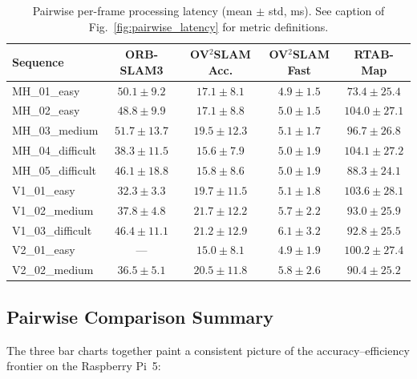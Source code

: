 \documentclass[11pt]{article}
\begin{document}
\begin{table}[htbp]
  \centering
  \caption{Pairwise per-frame processing latency (mean $\pm$ std, ms). See caption of Fig.~\ref{fig:pairwise_latency} for metric definitions.}
  \label{tab:pairwise_latency}
  \small
  \begin{tabular}{lcccc}
    \hline
    Sequence & ORB-SLAM3 & OV$^2$SLAM Acc. & OV$^2$SLAM Fast & RTAB-Map \\
    \hline
    MH\_01\_easy      & $50.1 \pm 9.2$   & $17.1 \pm 8.1$  & $4.9 \pm 1.5$  & $73.4 \pm 25.4$ \\
    MH\_02\_easy      & $48.8 \pm 9.9$   & $17.1 \pm 8.8$  & $5.0 \pm 1.5$  & $104.0 \pm 27.1$ \\
    MH\_03\_medium    & $51.7 \pm 13.7$  & $19.5 \pm 12.3$ & $5.1 \pm 1.7$  & $96.7 \pm 26.8$ \\
    MH\_04\_difficult & $38.3 \pm 11.5$  & $15.6 \pm 7.9$  & $5.0 \pm 1.9$  & $104.1 \pm 27.2$ \\
    MH\_05\_difficult & $46.1 \pm 18.8$  & $15.8 \pm 8.6$  & $5.0 \pm 1.9$  & $88.3 \pm 24.1$ \\
    V1\_01\_easy      & $32.3 \pm 3.3$   & $19.7 \pm 11.5$ & $5.1 \pm 1.8$  & $103.6 \pm 28.1$ \\
    V1\_02\_medium    & $37.8 \pm 4.8$   & $21.7 \pm 12.2$ & $5.7 \pm 2.2$  & $93.0 \pm 25.9$ \\
    V1\_03\_difficult & $46.4 \pm 11.1$  & $21.2 \pm 12.9$ & $6.1 \pm 3.2$  & $92.8 \pm 25.5$ \\
    V2\_01\_easy      & ---              & $15.0 \pm 8.1$  & $4.9 \pm 1.9$  & $100.2 \pm 27.4$ \\
    V2\_02\_medium    & $36.5 \pm 5.1$   & $20.5 \pm 11.8$ & $5.8 \pm 2.6$  & $90.4 \pm 25.2$ \\
    \hline
  \end{tabular}
\end{table}

\subsection*{Pairwise Comparison Summary}

The three bar charts together paint a consistent picture of the accuracy--efficiency frontier on the Raspberry Pi~5:
\end{document}
